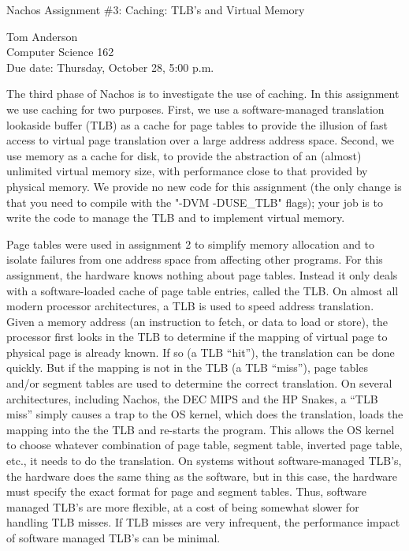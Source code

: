 	


\begin{center}
{\large Nachos Assignment \#3: Caching: TLB's and Virtual Memory

\vspace{.2in}
Tom Anderson\\
Computer Science 162\\
Due date: Thursday, October 28, 5:00 p.m.
}
\end{center}

\vspace{.2in}

The third phase of Nachos is to investigate the use of caching.
In this assignment we use caching for two purposes.  First,
we use a software-managed translation lookaside buffer (TLB) as a cache 
for page tables to provide the illusion of fast access to virtual page 
translation over a large address address space.
Second, we use memory as a cache for disk,
to provide the abstraction of an (almost) unlimited virtual memory size,
with performance close to that provided by physical memory.
We provide no new code for this assignment (the only change is that
you need to compile with the "-DVM -DUSE\_TLB" flags); your job is
to write the code to manage the TLB and to implement virtual memory.

Page tables were used in assignment 2 to simplify memory 
allocation and to isolate failures from one address space from 
affecting other programs.  For this assignment, the hardware
knows nothing about page tables.  Instead it only deals with a software-loaded
cache of page table entries, called the TLB.
On almost all modern processor architectures, a TLB 
is used to speed address translation.  Given a memory
address (an instruction to fetch, or data to load or store), the processor
first looks in the TLB to determine if the mapping of virtual page
to physical page is already known.  If so (a TLB ``hit''), the translation 
can be done
quickly.  But if the mapping is not in the TLB (a TLB ``miss''), page tables 
and/or segment tables are used to determine the correct translation.
On several architectures, including Nachos, the DEC MIPS and 
the HP Snakes, a ``TLB miss'' simply causes a trap to the OS kernel, 
which does the
translation, loads the mapping into the the TLB and re-starts the program.
This allows the OS kernel to choose whatever combination of page table,
segment table, inverted page table, etc., it needs to do the translation.
On systems without software-managed TLB's, the hardware does the same thing
as the software, but in this case, the hardware must specify the exact
format for page and segment tables.  Thus, software managed TLB's are
more flexible, at a cost of being somewhat slower for handling TLB misses.
If TLB misses are very infrequent, the performance impact of software managed 
TLB's can be minimal.

